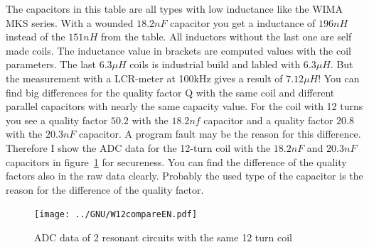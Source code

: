 The capacitors in this table are all types with low inductance like the
WIMA MKS series. With a wounded \(18.2nF\) capacitor you get a inductance of
\(196nH\) instead of the \(151nH\) from the table.
All inductors without the last one are self made coils.
The inductance value in brackets are computed values with the coil parameters.
The last \(6.3\mu H\) coils is industrial build and labled with \(6.3\mu H\).
But the measurement with a LCR-meter at 100kHz gives a result of \(7.12\mu H\)!
You can find big differences for the quality factor Q with the same coil and
different parallel capacitors with nearly the same capacity value. 
For the coil with 12 turns you see a quality factor \(50.2\) with the \(18.2nf\)
capacitor and a quality factor \(20.8\) with the \(20.3nF\) capacitor.
A program fault may be the reason for this difference.
Therefore I show the ADC data for the 12-turn coil with the \(18.2nF\) and \(20.3nF\)
capacitors in figure~\ref{fig:W12compare} for secureness.
You can find the difference of the quality factors also in the raw data clearly.
Probably the used type of the capacitor is the reason for the difference of
the quality factor.

\begin{figure}[H]
\centering
\texttt{[image: ../GNU/W12compareEN.pdf]}
\caption{ADC data of 2 resonant circuits with the same 12 turn coil}
\label{fig:W12compare}
\end{figure}

